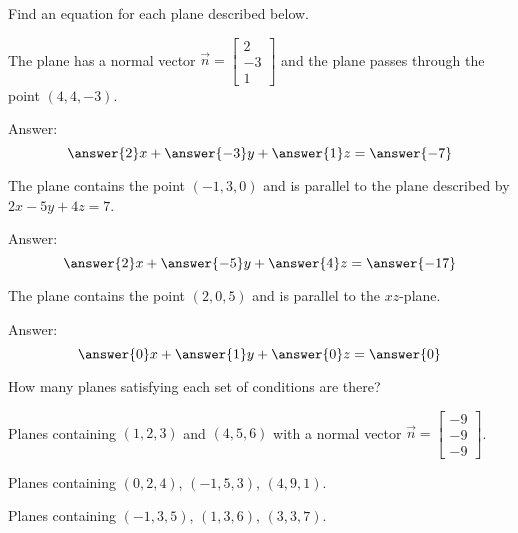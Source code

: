 \documentclass{ximera}
\author{Zack Reed}
\begin{document}
Find an equation for each plane described below.
 
  \begin{problem}\label{prob:eqplane1}
  The plane has a normal vector $\vec{n}=\begin{bmatrix}2\\-3\\1\end{bmatrix}$ and the plane passes through the point $(4, 4, -3)$.
   
  Answer: $$\answer{2}x+\answer{-3}y+\answer{1}z=\answer{-7}$$
  \end{problem}
   
  \begin{problem}\label{prob:eqplane2}
  The plane contains the point $(-1, 3, 0)$ and is parallel to the plane described by $2x-5y+4z=7$.
   
  Answer:
  $$\answer{2}x+\answer{-5}y+\answer{4}z=\answer{-17}$$
  \end{problem}
   
  \begin{problem}\label{prob:eqplane3}
  The plane contains the point $(2, 0, 5)$ and is parallel to the $xz$-plane.
   
  Answer:
  $$\answer{0}x+\answer{1}y+\answer{0}z=\answer{0}$$
  \end{problem}
 
 
 
 
How many planes satisfying each set of conditions are there?
 
\begin{problem}\label{prob:eqplane4}
Planes containing $(1, 2, 3)$ and $(4, 5, 6)$ with a normal vector $\vec{n}=\begin{bmatrix}-9\\-9\\-9\end{bmatrix}$.
\begin{multipleChoice}
 \end{multipleChoice}
\end{problem}
 
\begin{problem}\label{prob:eqplane5}
Planes containing $(0,2, 4)$, $(-1, 5, 3)$, $(4, 9, 1)$.
\begin{multipleChoice}
 \end{multipleChoice}
\end{problem}
 
\begin{problem}\label{prob:eqplane6}
Planes containing $(-1, 3, 5)$, $(1, 3, 6)$, $(3, 3, 7)$.
\begin{multipleChoice}
 \end{multipleChoice}
\end{problem}
\end{document}

